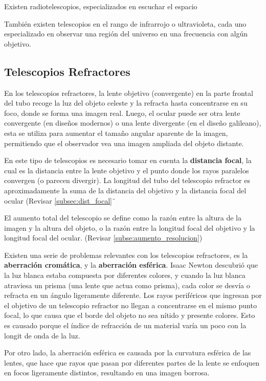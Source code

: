 Existen radiotelescopios, especializados en escuchar el espacio

También existen telescopios en el rango de infrarrojo o ultravioleta, cada uno especializado en observar una región del universo en una frecuencia con algún objetivo. 



\subsection{Telescopios Refractores}


En los telescopios refractores, la lente objetivo (convergente) en la parte frontal del tubo recoge la luz del objeto celeste y la refracta hasta concentrarse en su foco, donde se forma una imagen real. Luego, el ocular puede ser otra lente convergente (en diseños modernos) o una lente divergente (en el diseño galileano), esta se utiliza para aumentar el tamaño angular aparente de la imagen, permitiendo que el observador vea una imagen ampliada del objeto distante.

En este tipo de telescopios es necesario tomar en cuenta la \textbf{distancia focal}, la cual es la distancia entre la lente objetivo y el punto donde los rayos paralelos convergen (o parecen divergir). La longitud del tubo del telescopio refractor es aproximadamente la suma de la distancia del objetivo y la distancia focal del ocular (Revisar \ref{subsec:dist_focal}¨ 

El aumento total del telescopio se define como la razón entre la altura de la imagen y la altura del objeto, o la razón entre la longitud focal del objetivo y la longitud focal del ocular. (Revisar \ref{subse:aumento_resolucion})

Existen una serie de problemas relevantes con los telescopios refractores, es la \textbf{aberración cromática}, y la \textbf{aberración esférica}. Isaac Newton descubrió que la luz blanca estaba compuesta por diferentes colores, y cuando la luz blanca atraviesa un prisma (una lente que actua como prisma), cada color se desvía o refracta en un ángulo ligeramente diferente. Los rayos periféricos que ingresan por el objetivo de un telescopio refractor no llegan a concentrarse en el mismo punto focal, lo que causa que el borde del objeto no sea nítido y presente colores. Esto es causado porque el índice de refracción de un material varía un poco con la longit de onda de la luz. 

Por otro lado, la aberración esférica es causada por la curvatura esférica de las lentes, que hace que rayos que pasan por diferentes partes de la lente se enfoquen en focos ligeramente distintos, resultando en una imagen borrosa. 

